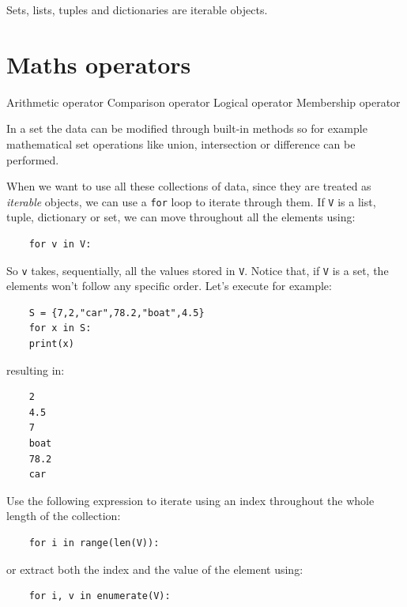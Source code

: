 \newpage
Sets, lists, tuples and dictionaries are iterable objects.




 

 












\newpage
    \section{Maths operators}
Arithmetic operator 
Comparison operator 
Logical operator 
Membership operator 



In a set the data can be modified through built-in methods so for example mathematical set operations like union, intersection or difference can be performed.



When we want to use all these collections of data, since they are treated as \textit{iterable} objects, we can use a \texttt{for} loop to iterate through them. 
If \texttt{V} is a list, tuple, dictionary or set, we can move throughout all the elements using:
\begin{verbatim}
    for v in V:
\end{verbatim}
So \texttt{v} takes, sequentially, all the values stored in \texttt{V}. 
Notice that, if \texttt{V} is a set, the elements won't follow any specific order. 
Let's execute for example:
\begin{verbatim}
    S = {7,2,"car",78.2,"boat",4.5}
    for x in S:
    print(x)
\end{verbatim}
resulting in:
\begin{verbatim}
    2
    4.5
    7
    boat
    78.2
    car
\end{verbatim}
Use the following expression to iterate using an index throughout the whole length of the collection:
\begin{verbatim}
    for i in range(len(V)): 
\end{verbatim}
or extract both the index and the value of the element using:
\begin{verbatim}
    for i, v in enumerate(V):
\end{verbatim}












